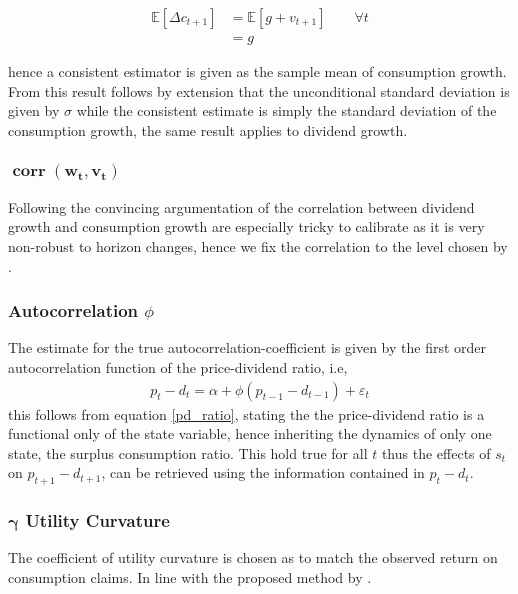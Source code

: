 \begin{align}
    \mathbb{E}\left[ \Delta c_{t+1} \right] &=  \mathbb{E}\left[ g + v_{t+1} \right]\qquad \forall t\nonumber \\
    & = g
\end{align}

hence a consistent estimator is given as the sample mean of consumption growth. From this result follows by extension that the unconditional standard deviation is given by $\sigma$ while the consistent estimate is simply the standard deviation of the consumption growth, the same result applies to dividend growth.

\subsubsection{$\mathbf{\operatorname{corr}(w_t, v_t)}$}
Following the convincing argumentation of \citet{Campbell1999} the correlation between dividend growth and consumption growth are especially tricky to calibrate as it is very non-robust to horizon changes, hence we fix the correlation to the level chosen by \citet{Campbell1999}.

\subsubsection{Autocorrelation $\phi$}
The estimate for the true autocorrelation-coefficient is given by the first order autocorrelation function of the price-dividend ratio, i.e,
\begin{align}
    p_t - d_t = \alpha + \phi \left( p_{t-1} - d_{t-1} \right)+\varepsilon_t
\end{align}
this follows from equation \eqref{pd_ratio}, stating the the price-dividend ratio is a functional only of the state variable, hence inheriting the dynamics of only one state, the surplus consumption ratio. This hold true for all $t$ thus the effects of $s_t$ on $p_{t+1}-d_{t+1}$, can be retrieved using the information contained in $p_t-d_t$.

\subsubsection{$\mathbf{\gamma}$ Utility Curvature}
The coefficient of utility curvature is chosen as to match the observed return on consumption claims. In line with the proposed method by \citet{Campbell1999}.

